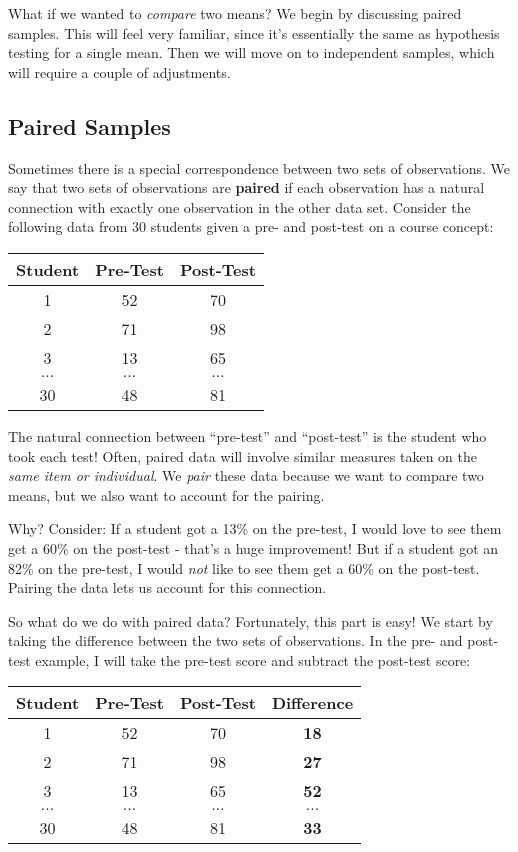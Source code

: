 \documentclass[
]{book}
\begin{document}
What if we wanted to \emph{compare} two means? We begin by discussing paired samples. This will feel very familiar, since it's essentially the same as hypothesis testing for a single mean. Then we will move on to independent samples, which will require a couple of adjustments.

\hypertarget{paired-samples}{%
\subsection{Paired Samples}\label{paired-samples}}

Sometimes there is a special correspondence between two sets of observations. We say that two sets of observations are \textbf{paired} if each observation has a natural connection with exactly one observation in the other data set. Consider the following data from 30 students given a pre- and post-test on a course concept:

\begin{longtable}[]{@{}ccc@{}}
\toprule
Student & Pre-Test & Post-Test \\
\midrule
\endhead
1 & 52 & 70 \\
2 & 71 & 98 \\
3 & 13 & 65 \\
\(\dots\) & \(\dots\) & \(\dots\) \\
30 & 48 & 81 \\
\bottomrule
\end{longtable}

The natural connection between ``pre-test'' and ``post-test'' is the student who took each test! Often, paired data will involve similar measures taken on the \emph{same item or individual}. We \emph{pair} these data because we want to compare two means, but we also want to account for the pairing.

Why? Consider: If a student got a 13\% on the pre-test, I would love to see them get a 60\% on the post-test - that's a huge improvement! But if a student got an 82\% on the pre-test, I would \emph{not} like to see them get a 60\% on the post-test. Pairing the data lets us account for this connection.

So what do we do with paired data? Fortunately, this part is easy! We start by taking the difference between the two sets of observations. In the pre- and post-test example, I will take the pre-test score and subtract the post-test score:

\begin{longtable}[]{@{}cccc@{}}
\toprule
Student & Pre-Test & Post-Test & \textbf{Difference} \\
\midrule
\endhead
1 & 52 & 70 & \textbf{18} \\
2 & 71 & 98 & \textbf{27} \\
3 & 13 & 65 & \textbf{52} \\
\(\dots\) & \(\dots\) & \(\dots\) & \(\dots\) \\
30 & 48 & 81 & \textbf{33} \\
\bottomrule
\end{longtable}
\end{document}
